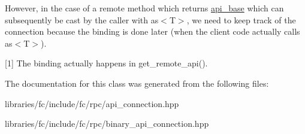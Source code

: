 However, in the case of a remote method which returns \mbox{\hyperlink{classfc_1_1api__base}{api\+\_\+base}} which can subsequently be cast by the caller with as$<$\+T$>$, we need to keep track of the connection because the binding is done later (when the client code actually calls as$<$\+T$>$).

\mbox{[}1\mbox{]} The binding actually happens in get\+\_\+remote\+\_\+api(). 

The documentation for this class was generated from the following files\+:\begin{DoxyCompactItemize}
\item 
libraries/fc/include/fc/rpc/api\+\_\+connection.\+hpp\item 
libraries/fc/include/fc/rpc/binary\+\_\+api\+\_\+connection.\+hpp\end{DoxyCompactItemize}
